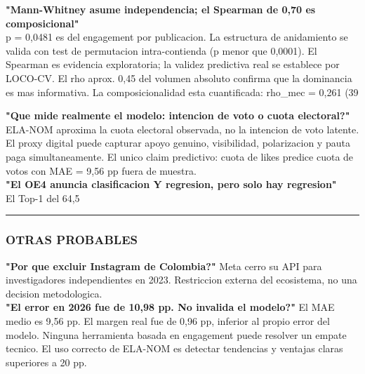 \documentclass[11pt,a4paper]{article}
\begin{document}
{{{\textbf{"Mann-Whitney asume independencia; el Spearman de 0,70 es composicional"}\\[2pt]
p = 0,0481 es del engagement por publicacion. La estructura de anidamiento se valida con test de permutacion intra-contienda (p menor que 0,0001). El Spearman es evidencia exploratoria; la validez predictiva real se establece por LOCO-CV. El rho aprox. 0,45 del volumen absoluto confirma que la dominancia es mas informativa. La composicionalidad esta cuantificada: rho_mec = 0,261 (39%

\textbf{"Que mide realmente el modelo: intencion de voto o cuota electoral?"}\\[2pt]
ELA-NOM aproxima la cuota electoral observada, no la intencion de voto latente. El proxy digital puede capturar apoyo genuino, visibilidad, polarizacion y pauta paga simultaneamente. El unico claim predictivo: cuota de likes predice cuota de votos con MAE = 9,56 pp fuera de muestra.\\[2pt]

\textbf{"El OE4 anuncia clasificacion Y regresion, pero solo hay regresion"}\\[2pt]
El Top-1 del 64,5%

\vspace{4pt}\noindent\rule{\linewidth}{0.4pt}\vspace{4pt}

\subsubsection{OTRAS PROBABLES}

\textbf{"Por que excluir Instagram de Colombia?"} Meta cerro su API para investigadores independientes en 2023. Restriccion externa del ecosistema, no una decision metodologica.\\[2pt]

\textbf{"El error en 2026 fue de 10,98 pp. No invalida el modelo?"} El MAE medio es 9,56 pp. El margen real fue de 0,96 pp, inferior al propio error del modelo. Ninguna herramienta basada en engagement puede resolver un empate tecnico. El uso correcto de ELA-NOM es detectar tendencias y ventajas claras superiores a 20 pp.\\[2pt]

}}}
\end{document}

